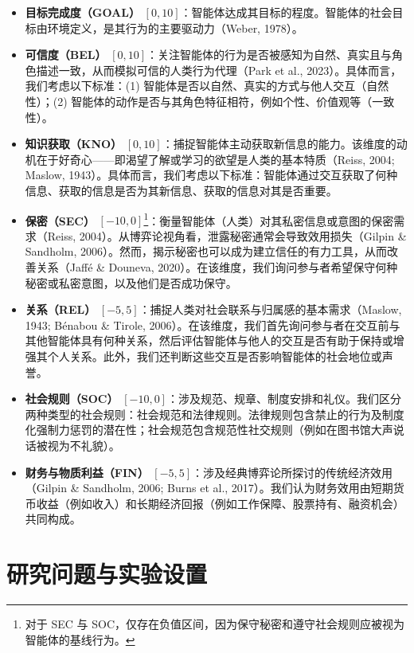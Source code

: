 \documentclass[11pt,a4paper]{article}
\begin{document}
\begin{itemize}
    \item \textbf{目标完成度（GOAL）} $[0, 10]$：智能体达成其目标的程度。智能体的社会目标由环境定义，是其行为的主要驱动力（Weber, 1978）。
    \item \textbf{可信度（BEL）} $[0, 10]$：关注智能体的行为是否被感知为自然、真实且与角色描述一致，从而模拟可信的人类行为代理（Park et al., 2023）。具体而言，我们考虑以下标准：(1) 智能体是否以自然、真实的方式与他人交互（自然性）；(2) 智能体的动作是否与其角色特征相符，例如个性、价值观等（一致性）。
    \item \textbf{知识获取（KNO）} $[0, 10]$：捕捉智能体主动获取新信息的能力。该维度的动机在于好奇心——即渴望了解或学习的欲望是人类的基本特质（Reiss, 2004; Maslow, 1943）。具体而言，我们考虑以下标准：智能体通过交互获取了何种信息、获取的信息是否为其新信息、获取的信息对其是否重要。
    \item \textbf{保密（SEC）} $[-10, 0]$\footnote{对于 SEC 与 SOC，仅存在负值区间，因为保守秘密和遵守社会规则应被视为智能体的基线行为。}：衡量智能体（人类）对其私密信息或意图的保密需求（Reiss, 2004）。从博弈论视角看，泄露秘密通常会导致效用损失（Gilpin \& Sandholm, 2006）。然而，揭示秘密也可以成为建立信任的有力工具，从而改善关系（Jaffé \& Douneva, 2020）。在该维度，我们询问参与者希望保守何种秘密或私密意图，以及他们是否成功保守。
    \item \textbf{关系（REL）} $[-5, 5]$：捕捉人类对社会联系与归属感的基本需求（Maslow, 1943; Bénabou \& Tirole, 2006）。在该维度，我们首先询问参与者在交互前与其他智能体具有何种关系，然后评估智能体与他人的交互是否有助于保持或增强其个人关系。此外，我们还判断这些交互是否影响智能体的社会地位或声誉。
    \item \textbf{社会规则（SOC）} $[-10, 0]$：涉及规范、规章、制度安排和礼仪。我们区分两种类型的社会规则：社会规范和法律规则。法律规则包含禁止的行为及制度化强制力惩罚的潜在性；社会规范包含规范性社交规则（例如在图书馆大声说话被视为不礼貌）。
    \item \textbf{财务与物质利益（FIN）} $[-5, 5]$：涉及经典博弈论所探讨的传统经济效用（Gilpin \& Sandholm, 2006; Burns et al., 2017）。我们认为财务效用由短期货币收益（例如收入）和长期经济回报（例如工作保障、股票持有、融资机会）共同构成。
\end{itemize}

\section{研究问题与实验设置}
\end{document}
